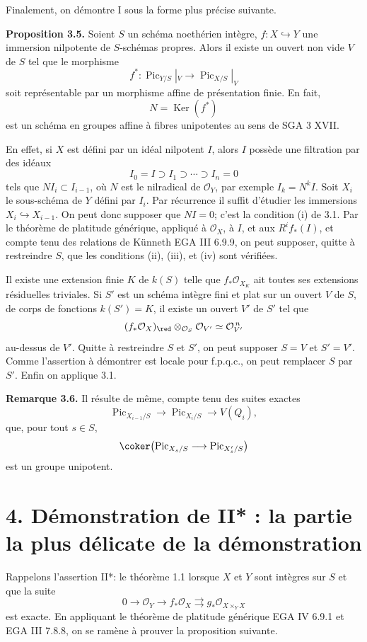\documentclass[11pt]{article}
\providecommand{\Pic}{\operatorname{Pic}}
\providecommand{\Ker}{\operatorname{Ker}}
\begin{document}
Finalement, on démontre I sous la forme plus précise suivante.

\textbf{Proposition 3.5.} Soient \(S\) un schéma noethérien intègre, \(f:X\hookrightarrow Y\) une immersion nilpotente de \(S\)-schémas propres. Alors il existe un ouvert non vide \(V\) de \(S\) tel que le morphisme
\[
  f^*:\Pic_{Y/S}|_V\longrightarrow\Pic_{X/S}|_V
\]
soit représentable par un morphisme affine de présentation finie. En fait,
\[
  N=\Ker(f^*)
\]
est un schéma en groupes affine à fibres unipotentes au sens de SGA 3 XVII.

En effet, si \(X\) est défini par un idéal nilpotent \(I\), alors \(I\) possède une filtration par des idéaux
\[
  I_0=I\supset I_1\supset\cdots\supset I_n=0
\]
tels que \(NI_i\subset I_{i-1}\), où \(N\) est le nilradical de \(\mathcal O_Y\), par exemple \(I_k=N^kI\). Soit \(X_i\) le sous-schéma de \(Y\) défini par \(I_i\). Par récurrence il suffit d'étudier les immersions \(X_i\hookrightarrow X_{i-1}\). On peut donc supposer que \(NI=0\); c'est la condition (i) de 3.1. Par le théorème de platitude générique, appliqué à \(\mathcal O_X\), à \(I\), et aux \(R^if_*(I)\), et compte tenu des relations de Künneth EGA III 6.9.9, on peut supposer, quitte à restreindre \(S\), que les conditions (ii), (iii), et (iv) sont vérifiées.

Il existe une extension finie \(K\) de \(k(S)\) telle que \(f_*\mathcal O_{X_K}\) ait toutes ses extensions résiduelles triviales. Si \(S'\) est un schéma intègre fini et plat sur un ouvert \(V\) de \(S\), de corps de fonctions \(k(S')=K\), il existe un ouvert \(V'\) de \(S'\) tel que
\[
  (f_*\mathcal O_X)_{\red}\otimes_{\mathcal O_S}\mathcal O_{V'}
  \simeq \mathcal O_{V'}^{\,n}
\]
au-dessus de \(V'\). Quitte à restreindre \(S\) et \(S'\), on peut supposer \(S=V\) et \(S'=V'\). Comme l'assertion à démontrer est locale pour f.p.q.c., on peut remplacer \(S\) par \(S'\). Enfin on applique 3.1.

\textbf{Remarque 3.6.} Il résulte de même, compte tenu des suites exactes
\[
  \Pic_{X_{i-1}/S}\longrightarrow\Pic_{X_i/S}\longrightarrow V(Q_i),
\]
que, pour tout \(s\in S\),
\[
  \coker\bigl(\Pic_{X_s/S}\longrightarrow\Pic_{X'_s/S}\bigr)
\]
est un groupe unipotent.

\section*{4. Démonstration de II* : la partie la plus délicate de la démonstration}

Rappelons l'assertion II*: le théorème 1.1 lorsque \(X\) et \(Y\) sont intègres sur \(S\) et que la suite
\[
  0\longrightarrow\mathcal O_Y\longrightarrow f_*\mathcal O_X
  \rightrightarrows g_*\mathcal O_{X\times_YX}
\]
est exacte. En appliquant le théorème de platitude générique EGA IV 6.9.1 et EGA III 7.8.8, on se ramène à prouver la proposition suivante.
\end{document}
